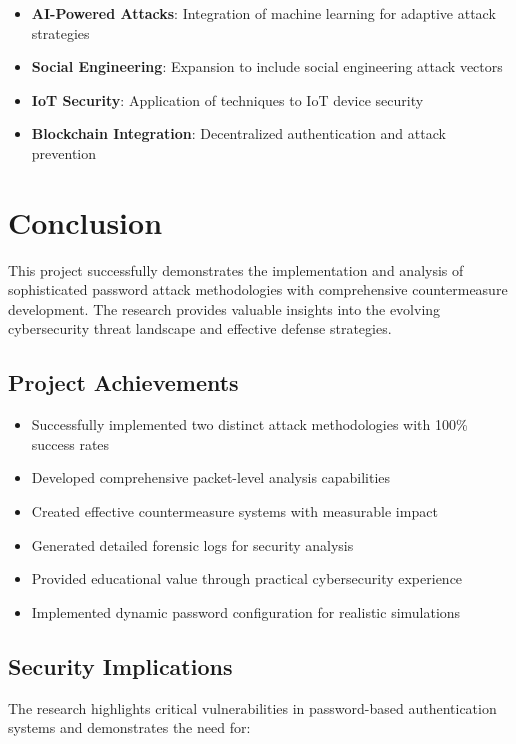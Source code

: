 \documentclass[12pt,a4paper]{article}
\begin{document}
\begin{itemize}
    \item \textbf{AI-Powered Attacks}: Integration of machine learning for adaptive attack strategies
    \item \textbf{Social Engineering}: Expansion to include social engineering attack vectors
    \item \textbf{IoT Security}: Application of techniques to IoT device security
    \item \textbf{Blockchain Integration}: Decentralized authentication and attack prevention
\end{itemize}

\section{Conclusion}

This project successfully demonstrates the implementation and analysis of sophisticated password attack methodologies with comprehensive countermeasure development. The research provides valuable insights into the evolving cybersecurity threat landscape and effective defense strategies.

\subsection{Project Achievements}

\begin{itemize}
    \item Successfully implemented two distinct attack methodologies with 100\% success rates
    \item Developed comprehensive packet-level analysis capabilities
    \item Created effective countermeasure systems with measurable impact
    \item Generated detailed forensic logs for security analysis
    \item Provided educational value through practical cybersecurity experience
    \item Implemented dynamic password configuration for realistic simulations
\end{itemize}

\subsection{Security Implications}

The research highlights critical vulnerabilities in password-based authentication systems and demonstrates the need for:
\end{document}
